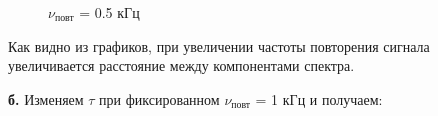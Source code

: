\documentclass[a4paper,12pt]{article} %
\begin{document}
\begin{enumerate}
\begin{figure}[h!]
\begin{minipage}[h]{0.47\linewidth}
\end{minipage}
\vfill
\begin{minipage}[h]{0.47\linewidth}
 $\nu_\text{повт}$ = 0.5 кГц  \\
\end{minipage}
\caption{}
\label{ris:experimentalcorrelationsignals}
\end{figure}
\vfill

Как видно из графиков, при увеличении частоты повторения сигнала увеличивается расстояние между компонентами спектра.

\newpage


\textbf{б.} Изменяем $\tau$ при фиксированном $\nu_\text{повт}$ = 1 кГц и получаем:


\end{enumerate}
\end{document}
